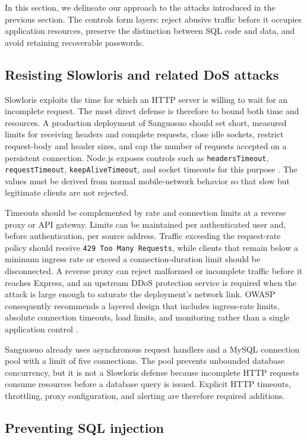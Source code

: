 In this section, we delineate our approach to the attacks introduced in the previous section. The controls form layers: reject abusive traffic before it occupies application resources, preserve the distinction between SQL code and data, and avoid retaining recoverable passwords.

\subsection{Resisting Slowloris and related DoS attacks}

Slowloris exploits the time for which an HTTP server is willing to wait for an incomplete request. The most direct defense is therefore to bound both time and resources. A production deployment of Sanguosuo should set short, measured limits for receiving headers and complete requests, close idle sockets, restrict request-body and header sizes, and cap the number of requests accepted on a persistent connection. Node.js exposes controls such as \verb|headersTimeout|, \verb|requestTimeout|, \verb|keepAliveTimeout|, and socket timeouts for this purpose \cite{NodeHTTP}. The values must be derived from normal mobile-network behavior so that slow but legitimate clients are not rejected.

Timeouts should be complemented by rate and connection limits at a reverse proxy or API gateway. Limits can be maintained per authenticated user and, before authentication, per source address. Traffic exceeding the request-rate policy should receive \verb|429 Too Many Requests|, while clients that remain below a minimum ingress rate or exceed a connection-duration limit should be disconnected. A reverse proxy can reject malformed or incomplete traffic before it reaches Express, and an upstream DDoS protection service is required when the attack is large enough to saturate the deployment's network link. OWASP consequently recommends a layered design that includes ingress-rate limits, absolute connection timeouts, load limits, and monitoring rather than a single application control \cite{OWASPDoS}.

Sanguosuo already uses asynchronous request handlers and a MySQL connection pool with a limit of five connections. The pool prevents unbounded database concurrency, but it is not a Slowloris defense because incomplete HTTP requests consume resources before a database query is issued. Explicit HTTP timeouts, throttling, proxy configuration, and alerting are therefore required additions.

\subsection{Preventing SQL injection}

